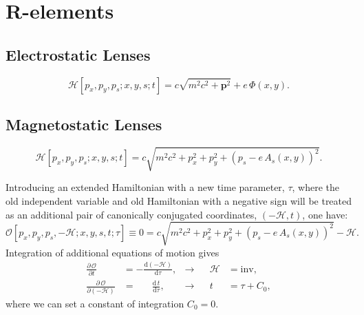 \documentclass[]{article}
\begin{document}
\section{R-elements}

\newpage
\subsection{Electrostatic Lenses}

\[
	\mathcal{H}[p_x,p_y,p_s;x,y,s;t] =
	c \sqrt{ m^2c^2 + \mathbf{p}^2 }
	+e\,\Phi(x,y).
\]

\newpage
\subsection{Magnetostatic Lenses}

\[
	\mathcal{H}[p_x,p_y,p_s;x,y,s;t] =
	c \sqrt{ m^2c^2 + p_x^2 + p_y^2 +
		\left( p_s - e\,A_s(x,y) \right)^2 }.
\]

Introducing an extended Hamiltonian with a new time parameter, $\tau$, where the old independent variable and old Hamiltonian with a negative sign will be treated
as an additional pair of canonically conjugated coordinates, $(-\mathcal{H},t)$,
one have:
\[
\mathcal{O} [p_x,p_y,p_s,-\mathcal{H};x,y,s,t;\tau] \equiv 0 =
	c \sqrt{ m^2c^2 + p_x^2 + p_y^2 + \left( p_s - e\,A_s(x,y) \right)^2 } -
	\mathcal{H}.
\]
Integration of additional equations of motion gives
\begin{align}
\frac{\partial\,\mathcal{O}}{\partial t}\,\,\,\,		&= -
\frac{\mathrm{d}(-\mathcal{H})}{\mathrm{d}\tau},
	&\rightarrow&
& \mathcal{H} &= \mathrm{inv},												\\
\frac{\partial\,\mathcal{O}}{\partial(-\mathcal{H})}	&= \quad\,\,\,\,
\frac{\mathrm{d}\,t}{\mathrm{d}\tau},
	&\rightarrow&
& t &= \tau + C_0,
\end{align}
where we can set a constant of integration $C_0=0$.
\end{document}
